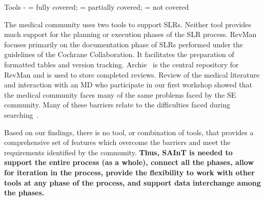 \begin{table}
	\centering
	\caption{Tools -  = fully covered;  = partially covered;  = not covered}
	
	\label{table-tools}
\end{table}

The medical community uses two tools to support SLRs.
Neither tool provides much support for the planning or execution phases of the SLR process.
RevMan~\cite{RevMan} focuses primarily on the documentation phase of SLRs performed under the guidelines of the Cochrane Collaboration. 
It facilitates the preparation of formatted tables and version tracking. 
Archie~\cite{Archie} is the central repository for RevMan and is used to store completed reviews. 
Review of the medical literature and interaction with an MD who participate in our first workshop showed that the medical community faces many of the same problems faced by the SE community.
Many of these barriers relate to the difficulties faced during searching~\cite{Bouamrane-etal:11, Frunza-etal:10, Young-Ward:01, Zwolsman-etal:13, Zwolsman-etal:12, Lai-etal:10}.

Based on our findings, there is no tool, or combination of tools, that provides a comprehensive set of features which overcome the barriers and meet the requirements identified by the community.  
\textbf{Thus, SAInT is needed to support the entire process (as a whole), connect all the phases, allow for iteration in the process, provide the flexibility to work with other tools at any phase of the process, and support data interchange among the phases.}

